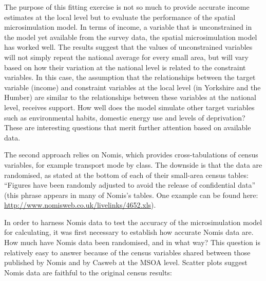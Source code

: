 \documentclass[a4paper, 11pt, twoside]{Thesis}
\begin{document}
The purpose of this fitting exercise is not so much to provide accurate income
estimates at the local level but to evaluate the
performance of the spatial microsimulation model. In terms of income, a variable
that is unconstrained in the model yet available from the survey data, the
spatial microsimulation model has worked well. The results suggest that the
values of unconstrained variables will not simply repeat the national average
for every small area, but will vary based on how their variation at the
national level is related to the constraint variables. In this case, the
assumption that the relationships between the target variable (income) and
constraint variables at the local level (in Yorkshire and the Humber) are
similar to the relationships between these variables at the national level,
receives support. How well does the model simulate other target variables such
as environmental habits, domestic energy use and levels of deprivation?
These are interesting
questions that merit further attention based on available data.

The second approach relies on Nomis, which provides cross-tabulations of census
variables, for example transport mode by class. The downside is that the data
are randomised, as stated at the bottom of each of their small-area census
tables: ``Figures have been randomly adjusted to avoid the release of
confidential data'' (this phrase appears in many of Nomis's tables.
One example can be found here:
\href{http://www.nomisweb.co.uk/livelinks/4652.xls}{http://www.nomisweb.co.uk/livelinks/4652.xls}).

In order to harness Nomis data to test the accuracy of the microsimulation
model for calculating, it was first necessary to establish how accurate Nomis
data are. How much have Nomis data been randomised, and in what way? 
This question is relatively easy to 
answer because of the census variables shared between those published 
by Nomis and by Casweb at the MSOA level. Scatter plots
suggest Nomis data are faithful to the original census results:
\end{document}
